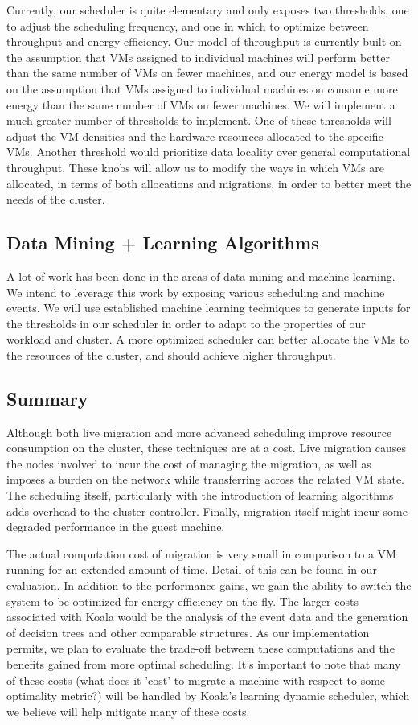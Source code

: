 Currently, our scheduler is quite elementary and only exposes two thresholds,
one to adjust the scheduling frequency, and one in which to optimize between
throughput and energy efficiency.  Our model of throughput is currently built on
the assumption that VMs assigned to individual machines will perform
better than the same number of VMs on fewer machines, and our energy model
is based on the assumption that VMs assigned to individual machines on
consume more energy than the same number of VMs on fewer machines.  We
will implement a much greater number of thresholds to implement.  One of these
thresholds will adjust the VM densities and the hardware resources allocated to
the specific VMs.  Another threshold would prioritize data locality over general
computational throughput.  These knobs will allow us to modify the ways in which
VMs are allocated, in terms of both allocations and migrations, in order to
better meet the needs of the cluster.

\subsection{Data Mining + Learning Algorithms}

A lot of work has been done in the areas of data mining and machine learning.
We intend to leverage this work by exposing various scheduling and machine
events.  We will use established machine learning techniques to generate inputs
for the thresholds in our scheduler in order to adapt to the properties of our
workload and cluster.  A more optimized scheduler can better allocate the
VMs to the resources of the cluster, and should achieve higher throughput.

\subsection{Summary}

Although both live migration and more advanced scheduling improve resource
consumption on the cluster, these techniques are at a cost.  Live migration
causes the nodes involved to incur the cost of managing the migration, as well
as imposes a burden on the network while transferring across the related VM
state.  The scheduling itself, particularly with the introduction of learning
algorithms adds overhead to the cluster controller.  Finally, migration itself
might incur some degraded performance in the guest machine.

The actual computation cost of migration is very small in comparison to a VM running for an extended amount of time.  Detail of this can be found in
our evaluation.  In addition to the performance gains, we gain the ability to
switch the system to be optimized for energy efficiency on the fly.  The larger
costs associated with Koala would be the analysis of the event data and the
generation of decision trees and other comparable structures.  As our
implementation permits, we plan to evaluate the trade-off between these
computations and the benefits gained from more optimal scheduling.  It's
important to note that many of these costs (what does it 'cost' to migrate a
machine with respect to some optimality metric?) will be handled by Koala's
learning dynamic scheduler, which we believe will help mitigate many of
these costs.
